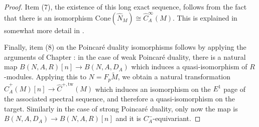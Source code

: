 \documentclass{memo-l}
\theoremstyle{definition}
\theoremstyle{remark}
\numberwithin{section}{chapter}
\numberwithin{equation}{chapter}
\begin{document}
\begin{proof}
Item (7), the existence of this long exact sequence, follows from the fact that there is an isomorphism $\text{Cone}(\widehat N_M) \cong \widehat C^\infty_A(M)$. This is explained in somewhat more detail in \cite[Lemma 5.38]{GOH}. 

Finally, item (8) on the Poincar\'e duality isomorphisms follows by applying the arguments of Chapter \label{borel}: in the case of weak Poincar\'e duality, there is a natural map $B(N, A, R)[n] \to B(N, A, D_A)$ which induces a quasi-isomorphism of $R$-modules. Applying this to $N = F_p \tilde M$, we obtain a natural transformation $\hat C^+_A(M)[n] \to \hat C^{+,\text{tw}}(M)$ which induces an isomorphism on the $E^1$ page of the associated spectral sequence, and therefore a quasi-isomorphism on the target. Similarly in the case of strong Poincar\'e duality, only now the map is $B(N, A, D_A) \to B(N, A, R)[n]$ and it is $C^-_A$-equivariant. 
\end{proof}
\backmatter


\printindex
\end{document}
